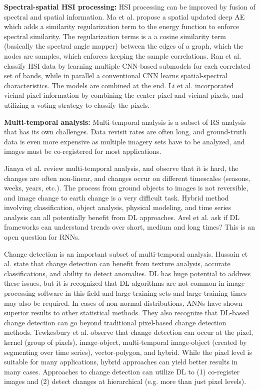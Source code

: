 \documentclass[12pt]{spieman}
\begin{document}
\begin{spacing}{1}
\textbf{Spectral-spatial HSI processing:} HSI processing can be improved by fusion of spectral and spatial information. Ma et al. \cite{ma2016spectral} propose a spatial updated deep AE which adds a similarity regularization term to the energy function to enforce spectral similarity. The regularization terms is a a cosine similarity term (basically the spectral angle mapper) between the edges of a graph, which the nodes are samples, which enforces keeping the sample correlations. Ran et al. \cite{ran2016bands} classify HSI data by learning multiple  CNN-based submodels for each correlated set of bands, while in parallel a conventional CNN learns spatial-spectral characteristics. The models are combined at the end. Li et al. \cite{li2017hyperspectral} incorporated vicinal pixel information by combining the center pixel and vicinal pixels, and utilizing a voting strategy to classify the pixels.

\textbf{Multi-temporal analysis:} Multi-temporal analysis is a subset of RS analysis that has its own challenges. Data revisit rates are often long, and ground-truth data is even more expensive as multiple imagery sets have to be analyzed, and images must be co-registered for most applications.

Jianya et al. \cite{jianya2008review} review multi-temporal analysis, and observe that it is hard, the changes are often non-linear, and changes occur on different timescales (seasons, weeks, years, etc.). The process from ground objects to images is not reversible, and image change to earth change is a very difficult task. Hybrid method involving classification, object analysis, physical modeling, and time series analysis can all potentially benefit from DL approaches. Arel et al. \cite{Arel2010} ask if DL frameworks can understand trends over short, medium and long times? This is an open question for RNNs.

Change detection is an important subset of multi-temporal analysis. Hussain et al. \cite{hussain2013change} state that change detection can benefit from texture analysis, accurate classifications, and ability to detect anomalies. DL has huge potential to address these issues, but it is recognized that DL algorithms are not common in image processing software in this field and large training sets and large training times may also be required. In cases of non-normal distributions, ANNs have shown superior results to other statistical methods. They also recognize that DL-based change detection can go beyond traditional pixel-based change detection methods. Tewkesbury et al. \cite{tewkesbury2015critical} observe that change detection can occur at the pixel, kernel (group of pixels), image-object, multi-temporal image-object (created by segmenting over time series), vector-polygon, and hybrid. While the pixel level is suitable for many applications, hybrid approaches can yield better results in many cases. Approaches to change detection can utilize DL to (1) co-register images and (2) detect changes at hierarchical (e.g. more than just pixel levels).



\end{spacing}
\end{document}
